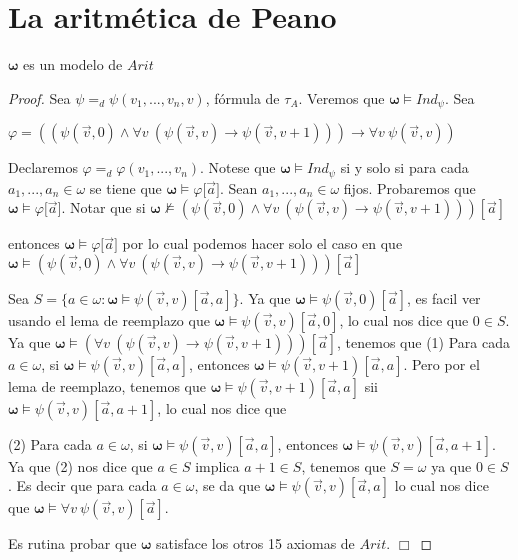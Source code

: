 \section{La aritmética de Peano}

  \begin{lemma}
    \(\mathbf{\omega }\) es un modelo de \(Arit\)
  \end{lemma}
  \begin{proof}
    Sea \(\psi =_{d}\psi (v_{1},...,v_{n},v)\), f\'{o}rmula de \(\tau _{A}\). Veremos que \(\mathbf{\omega }\vDash Ind_{\psi }\). Sea

    \(\displaystyle \varphi =((\psi (\vec{v},0)\wedge \forall v\ (\psi (\vec{v},v)\rightarrow \psi (\vec{v},v+1)))\rightarrow \forall v\ \psi (\vec{v},v)) \)

    Declaremos \(\varphi =_{d}\varphi (v_{1},...,v_{n})\). Notese que \(\mathbf{ \omega }\vDash Ind_{\psi }\) si y solo si para cada \(a_{1},...,a_{n}\in \omega \) se tiene que \(\mathbf{\omega }\vDash \varphi \lbrack \vec{a}]\). Sean \(a_{1},...,a_{n}\in \omega \) fijos. Probaremos que \(\mathbf{\omega } \vDash \varphi \lbrack \vec{a}]\). Notar que si
    \(\displaystyle \mathbf{\omega }\nvDash (\psi (\vec{v},0)\wedge \forall v\ (\psi (\vec{v} ,v)\rightarrow \psi (\vec{v},v+1)))[\vec{a}] \)

    entonces \(\mathbf{\omega }\vDash \varphi \lbrack \vec{a}]\) por lo cual podemos hacer solo el caso en que
    \(\displaystyle \mathbf{\omega }\vDash (\psi (\vec{v},0)\wedge \forall v\ (\psi (\vec{v} ,v)\rightarrow \psi (\vec{v},v+1)))[\vec{a}] \)

    Sea \(S=\{a\in \omega :\mathbf{\omega }\vDash \psi (\vec{v},v)[\vec{a},a]\}\). Ya que \(\mathbf{\omega }\vDash \psi (\vec{v},0)[\vec{a}]\), es facil ver usando el lema de reemplazo que \(\mathbf{\omega }\vDash \psi (\vec{v},v)[ \vec{a},0]\), lo cual nos dice que \(0\in S\). Ya que \(\mathbf{\omega }\vDash (\forall v\ (\psi (\vec{v},v)\rightarrow \psi (\vec{v},v+1)))[\vec{a}]\), tenemos que
    (1) Para cada \(a\in \omega \), si \(\mathbf{\omega }\vDash \psi (\vec{v} ,v)[\vec{a},a]\), entonces \(\mathbf{\omega }\vDash \psi (\vec{v},v+1)[\vec{a} ,a]\).
    Pero por el lema de reemplazo, tenemos que \(\mathbf{\omega }\vDash \psi ( \vec{v},v+1)[\vec{a},a]\) sii \(\mathbf{\omega }\vDash \psi (\vec{v},v)[\vec{a} ,a+1]\), lo cual nos dice que

    (2) Para cada \(a\in \omega \), si \(\mathbf{\omega }\vDash \psi (\vec{v} ,v)[\vec{a},a]\), entonces \(\mathbf{\omega }\vDash \psi (\vec{v},v)[\vec{a} ,a+1]\).
    Ya que (2) nos dice que \(a\in S\) implica \(a+1\in S\), tenemos que \(S=\omega \) ya que \(0\in S\). Es decir que para cada \(a\in \omega \), se da que \(\mathbf{ \omega }\vDash \psi (\vec{v},v)[\vec{a},a]\) lo cual nos dice que \(\mathbf{ \omega }\vDash \forall v\ \psi (\vec{v},v)[\vec{a}]\).

    Es rutina probar que \(\mathbf{\omega }\) satisface los otros 15 axiomas de \( Arit\). \(\Box\)
  \end{proof}

